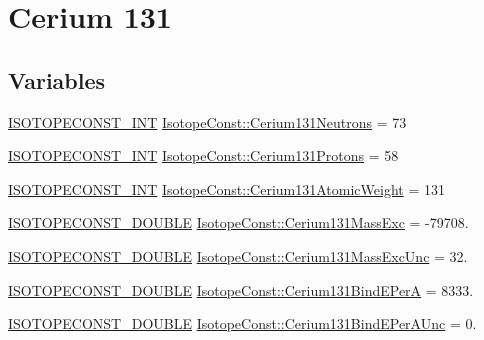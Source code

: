 \hypertarget{group___isotope_const-_cerium-_ce131}{}\section{Cerium 131}
\label{group___isotope_const-_cerium-_ce131}
\subsection*{Variables}
\begin{DoxyCompactItemize}
\item 
\mbox{\hyperlink{group___isotope_const-_macros_ga5f18360b3e99483a35c32d789e62621c}{I\+S\+O\+T\+O\+P\+E\+C\+O\+N\+S\+T\+\_\+\+I\+NT}} \mbox{\hyperlink{group___isotope_const-_cerium-_ce131_ga8ea70fc98dc376b0caee056b589993e3}{Isotope\+Const\+::\+Cerium131\+Neutrons}} = 73
\item 
\mbox{\hyperlink{group___isotope_const-_macros_ga5f18360b3e99483a35c32d789e62621c}{I\+S\+O\+T\+O\+P\+E\+C\+O\+N\+S\+T\+\_\+\+I\+NT}} \mbox{\hyperlink{group___isotope_const-_cerium-_ce131_ga6618eae96984c14dd11b2686a8032e3c}{Isotope\+Const\+::\+Cerium131\+Protons}} = 58
\item 
\mbox{\hyperlink{group___isotope_const-_macros_ga5f18360b3e99483a35c32d789e62621c}{I\+S\+O\+T\+O\+P\+E\+C\+O\+N\+S\+T\+\_\+\+I\+NT}} \mbox{\hyperlink{group___isotope_const-_cerium-_ce131_ga2aa45d6ee3f18cfe0f86491df2cc4fc2}{Isotope\+Const\+::\+Cerium131\+Atomic\+Weight}} = 131
\item 
\mbox{\hyperlink{group___isotope_const-_macros_ga8f45a7272ce02c0b4c65c44636ed719a}{I\+S\+O\+T\+O\+P\+E\+C\+O\+N\+S\+T\+\_\+\+D\+O\+U\+B\+LE}} \mbox{\hyperlink{group___isotope_const-_cerium-_ce131_ga81dd5141c0d7c9e3e679bf71d282eb5d}{Isotope\+Const\+::\+Cerium131\+Mass\+Exc}} = -\/79708.
\item 
\mbox{\hyperlink{group___isotope_const-_macros_ga8f45a7272ce02c0b4c65c44636ed719a}{I\+S\+O\+T\+O\+P\+E\+C\+O\+N\+S\+T\+\_\+\+D\+O\+U\+B\+LE}} \mbox{\hyperlink{group___isotope_const-_cerium-_ce131_ga35cccfe4265cbfb2e2a28536b2be49d5}{Isotope\+Const\+::\+Cerium131\+Mass\+Exc\+Unc}} = 32.
\item 
\mbox{\hyperlink{group___isotope_const-_macros_ga8f45a7272ce02c0b4c65c44636ed719a}{I\+S\+O\+T\+O\+P\+E\+C\+O\+N\+S\+T\+\_\+\+D\+O\+U\+B\+LE}} \mbox{\hyperlink{group___isotope_const-_cerium-_ce131_ga10268094af19adc0468c31acd42d385e}{Isotope\+Const\+::\+Cerium131\+Bind\+E\+PerA}} = 8333.
\item 
\mbox{\hyperlink{group___isotope_const-_macros_ga8f45a7272ce02c0b4c65c44636ed719a}{I\+S\+O\+T\+O\+P\+E\+C\+O\+N\+S\+T\+\_\+\+D\+O\+U\+B\+LE}} \mbox{\hyperlink{group___isotope_const-_cerium-_ce131_ga6a80198f32be5c63b3c37d374814a0f1}{Isotope\+Const\+::\+Cerium131\+Bind\+E\+Per\+A\+Unc}} = 0.

\end{DoxyCompactItemize}
